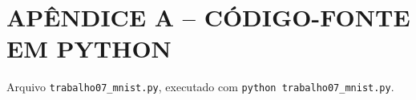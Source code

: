 \documentclass[12pt,a4paper]{article}
\begin{document}
\newpage
\pagestyle{abnt}
\begin{singlespace}

\end{singlespace}

\newpage
\section*{APÊNDICE A -- CÓDIGO-FONTE EM PYTHON}
\noindent Arquivo \texttt{trabalho07\_mnist.py}, executado com
\texttt{python trabalho07\_mnist.py}.
\begin{singlespace}

\end{singlespace}
\end{document}

